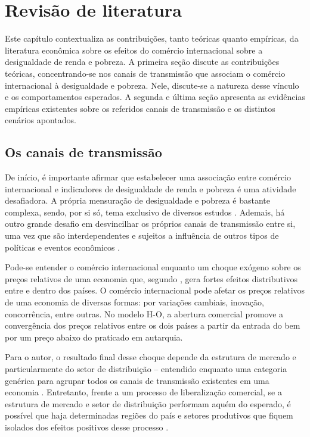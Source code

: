

\chapter{Revisão de literatura}\label{cha:revisao_de_literatura}

Este capítulo contextualiza as contribuições, tanto teóricas quanto empíricas, da literatura econômica sobre os efeitos do comércio internacional sobre a desigualdade de renda e pobreza. A primeira seção discute as contribuições teóricas, concentrando-se nos canais de transmissão que associam o comércio internacional à desigualdade e pobreza. Nele, discute-se a natureza desse vínculo e os comportamentos esperados. A segunda e última seção apresenta as evidências empíricas existentes sobre os referidos canais de transmissão e os distintos cenários apontados.



\section{Os canais de transmissão}\label{sec:canais_de_transmissao}

De início, é importante afirmar que estabelecer uma associação entre comércio internacional e indicadores de desigualdade de renda e pobreza é uma atividade desafiadora. A própria mensuração de desigualdade e pobreza é bastante complexa, sendo, por si só, tema exclusivo de diversos estudos \cite{neri06, soares09, hoffmann19}. Ademais, há outro grande desafio em desvincilhar os próprios canais de transmissão entre si, uma vez que são interdependentes e sujeitos a influência de outros tipos de políticas e eventos econômicos \cite{bannisterthugge01}.

Pode-se entender o comércio internacional enquanto um choque exógeno sobre os preços relativos de uma economia que, segundo \textcite{winters02}, gera fortes efeitos distributivos entre e dentro dos países. O comércio internacional pode afetar os preços relativos de uma economia de diversas formas: por variações cambiais, inovação, concorrência, entre outras. No modelo H-O, a abertura comercial promove a convergência dos preços relativos entre os dois países a partir da entrada do bem por um preço abaixo do praticado em autarquia.

Para o autor, o resultado final desse choque depende da estrutura de mercado e particularmente do setor de distribuição -- entendido enquanto uma categoria genérica para agrupar todos os canais de transmissão existentes em uma economia \cite{winters02}. Entretanto, frente a um processo de liberalização comercial, se a estrutura de mercado e setor de distribuição performam aquém do esperado, é possível que haja determinadas regiões do país e setores produtivos que fiquem isolados dos efeitos positivos desse processo \cite{bannisterthugge01}.

